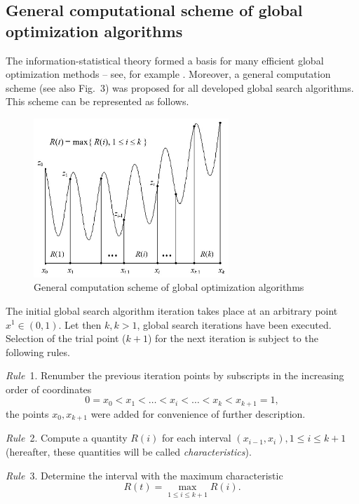 \documentclass[
11pt,%
tightenlines,%
twoside,%
onecolumn,%
nofloats,%
nobibnotes,%
nofootinbib,%
superscriptaddress,%
noshowpacs,%
centertags]%
{revtex4}
\begin{document}
\subsection{General computational scheme of global optimization algorithms}

The information-statistical theory \cite{Strongin1, Strongin3} formed a basis for many efficient global optimization methods -- see, for example \cite{Strongin2, Sergeyev4, Gergel1, Gergel2, Barkalov, Gergel3, Gergel4, Gergel5, Lera}. Moreover, a general computation scheme \cite{Strongin1, Strongin2, Strongin3, Grishagin1, Grishagin2} (see also Fig.~3) was proposed for all developed global search algorithms. This scheme can be represented as follows.

\begin{figure}
\centering
\includegraphics[height=6.0cm]{Fig3}
\caption{General computation scheme of global optimization algorithms}
\label{fig:Fig3}
\end{figure}

The initial global search algorithm iteration takes place at an arbitrary point $x^1 \in (0,1)$. Let then $k, k > 1$, global search iterations have been executed. Selection of the trial point ($k + 1$) for the next iteration is subject to the following rules.

\textit{Rule}~1. Renumber the previous iteration points by subscripts in the increasing order of coordinates
\begin{equation}
0 = x_0 < x_1 < \dots < x_i < \dots < x_k < x_{k+1} = 1,
\end{equation}
the points $x_0, x_{k+1}$ were added for convenience of further description.

\textit{Rule}~2. Compute a quantity $R(i)$ for each interval $(x_{i-1}, x_i), 1 \leq i \leq k + 1$ (hereafter, these quantities will be called \textit{characteristics}).

\textit{Rule}~3. Determine the interval with the maximum characteristic
\begin{equation}
R(t) = \max_{1 \leq i \leq k + 1}R(i).
\end{equation}
\end{document}
